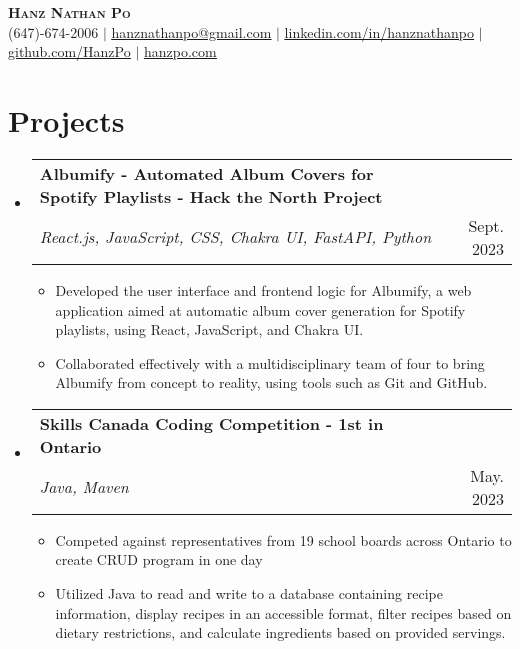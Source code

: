 \documentclass[letterpaper,11pt]{article}
\makeatletter
\newcommand{\resumeItem}[1]{
  \item\small{
    {#1 \vspace{-2pt}}
  }
}
\newcommand{\resumeProjectHeading}[2]{
    \item
    \begin{tabular*}{0.97\textwidth}{l@{\extracolsep{\fill}}r}
      \small#1 & #2 \\
    \end{tabular*}\vspace{-4pt}
}
\newcommand{\resumeSubHeadingListStart}{\begin{itemize}[leftmargin=0.15in, label={}]}
\newcommand{\resumeSubHeadingListEnd}{\end{itemize}}
\newcommand{\resumeItemListStart}{\begin{itemize}}
\newcommand{\resumeItemListEnd}{\end{itemize}\vspace{-5pt}}
\makeatother
\begin{document}

\begin{center}
    \textbf{\Huge \scshape Hanz Nathan Po} \\ \vspace{1pt}
    \small (647)-674-2006 $|$ \href{mailto:hanznathanpo@gmail.com}{\underline{hanznathanpo@gmail.com}} $|$ 
    \href{https://www.linkedin.com/in/hanznathanpo/}{\underline{linkedin.com/in/hanznathanpo}} $|$
    \href{https://github.com/HanzPo}{\underline{github.com/HanzPo}} $|$
    \href{https://www.hanzpo.com/}{\underline{hanzpo.com}}
\end{center}


\section{Projects}
\resumeSubHeadingListStart
      \resumeProjectHeading
          {\textbf{Albumify - Automated Album Covers for Spotify Playlists - Hack the North Project} \\ \emph{React.js, JavaScript, CSS, Chakra UI, FastAPI, Python}}{Sept. 2023}
          \resumeItemListStart
            \resumeItem{Developed the user interface and frontend logic for Albumify, a web application aimed at automatic album cover generation for Spotify playlists, using React, JavaScript, and Chakra UI.}
            \resumeItem{Collaborated effectively with a multidisciplinary team of four to bring Albumify from concept to reality, using tools such as Git and GitHub.}
          \resumeItemListEnd
    \resumeSubHeadingListEnd
 \resumeSubHeadingListStart
      \resumeProjectHeading
          {\textbf{Skills Canada Coding Competition - 1st in Ontario} \\ \emph{Java, Maven}}{May. 2023}
          \resumeItemListStart
            \resumeItem{Competed against representatives from 19 school boards across Ontario to create CRUD program in one day}
            \resumeItem{Utilized Java to read and write to a database containing recipe information, display recipes in an accessible format, filter recipes based on dietary restrictions, and calculate ingredients based on provided servings.}
          \resumeItemListEnd
    \resumeSubHeadingListEnd
    
\end{document}
